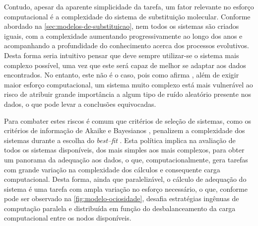 \documentclass[english,brazilian]{UNISINOSmonografia} %
\begin{document}
Contudo, apesar da aparente simplicidade da tarefa, um fator relevante no esforço computacional é a complexidade do sistema de substituição molecular.
Conforme abordado na \autoref{sec:modelos-de-substituicao}, nem todos os sistemas são criados iguais, com a complexidade aumentando progressivamente ao longo dos anos e acompanhando a profundidade do conhecimento acerca dos processos evolutivos.
Desta forma seria intuitivo pensar que deve sempre utilizar-se o sistema mais complexo possível, uma vez que este será capaz de melhor se adaptar aos dados encontrados. 
No entanto, este não é o caso, pois como afirma , além de exigir maior esforço computacional, um sistema muito complexo está mais vulnerável ao risco de atribuir grande importância a algum tipo de ruído aleatório presente nos dados, o que pode levar a conclusões equivocadas.


Para combater estes riscos é comum que critérios de seleção de sistemas, como os critérios de informação de Akaike \cite{Akaike1974} e Bayesianos \cite{Schwarz1978}, penalizem a complexidade dos sistemas durante a escolha do \textit{best--fit} \cite{yang2014molecular}.
Esta política implica na avaliação de todos os sistemas disponíveis, dos mais simples aos mais complexos, para obter um panorama da adequação aos dados, o que, computacionalmente, gera tarefas com grande variação na complexidade dos cálculos e consequente carga computacional.
Desta forma, ainda que paralelizável, o cálculo de adequação do sistema é uma tarefa com ampla variação no esforço necessário, o que, conforme pode ser observado na \autoref{fig:modelo-ociosidade}, desafia estratégias ingênuas de computação paralela e distribuída em função do desbalanceamento da carga computacional entre os nodos disponíveis.
\end{document}
